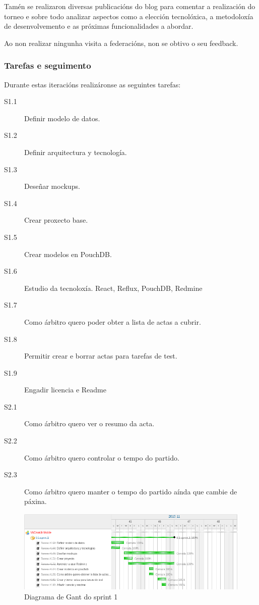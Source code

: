      Tamén se realizaron diversas publicacións do blog para comentar a 
realización do torneo e sobre todo analizar aspectos como a elección 
tecnolóxica, a metodoloxía de desenvolvemento e as próximas funcionalidades a 
abordar.

  Ao non realizar ningunha visita a federacións, non se obtivo o seu feedback.

      \subsubsection{Tarefas e seguimento}

      Durante estas iteracións realizáronse as seguintes tarefas:

        \begin{description}
         \item [S1.1] Definir modelo de datos.
         \item [S1.2] Definir arquitectura y tecnología.
         \item [S1.3] Deseñar mockups.
         \item [S1.4] Crear proxecto base.
         \item [S1.5] Crear modelos en PouchDB.
         \item [S1.6] Estudio da tecnoloxía. React, Reflux, PouchDB, Redmine
         \item [S1.7] Como árbitro quero poder obter a lista de actas a cubrir.
         \item [S1.8] Permitir crear e borrar actas para tarefas de test.
         \item [S1.9] Engadir licencia e Readme
         \item [S2.1] Como árbitro quero ver o resumo da acta.
         \item [S2.2] Como árbitro quero controlar o tempo do partido.
         \item [S2.3] Como árbitro quero manter o tempo do partido aínda que 
cambie de páxina.
         \end{description}

        \begin{figure}[h!]
          \begin{center}
          \includegraphics[width=\textwidth]{./img/gant_diagrams/01.png}
          \caption{Diagrama de Gant do sprint 1}
          \label{fig:gant01}
          \end{center}
        \end{figure}

